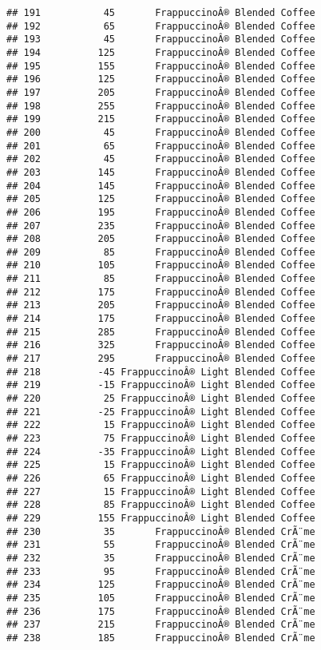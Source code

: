 \documentclass[
]{article}
\begin{document}
\begin{verbatim}
## 191           45       FrappuccinoÂ® Blended Coffee
## 192           65       FrappuccinoÂ® Blended Coffee
## 193           45       FrappuccinoÂ® Blended Coffee
## 194          125       FrappuccinoÂ® Blended Coffee
## 195          155       FrappuccinoÂ® Blended Coffee
## 196          125       FrappuccinoÂ® Blended Coffee
## 197          205       FrappuccinoÂ® Blended Coffee
## 198          255       FrappuccinoÂ® Blended Coffee
## 199          215       FrappuccinoÂ® Blended Coffee
## 200           45       FrappuccinoÂ® Blended Coffee
## 201           65       FrappuccinoÂ® Blended Coffee
## 202           45       FrappuccinoÂ® Blended Coffee
## 203          145       FrappuccinoÂ® Blended Coffee
## 204          145       FrappuccinoÂ® Blended Coffee
## 205          125       FrappuccinoÂ® Blended Coffee
## 206          195       FrappuccinoÂ® Blended Coffee
## 207          235       FrappuccinoÂ® Blended Coffee
## 208          205       FrappuccinoÂ® Blended Coffee
## 209           85       FrappuccinoÂ® Blended Coffee
## 210          105       FrappuccinoÂ® Blended Coffee
## 211           85       FrappuccinoÂ® Blended Coffee
## 212          175       FrappuccinoÂ® Blended Coffee
## 213          205       FrappuccinoÂ® Blended Coffee
## 214          175       FrappuccinoÂ® Blended Coffee
## 215          285       FrappuccinoÂ® Blended Coffee
## 216          325       FrappuccinoÂ® Blended Coffee
## 217          295       FrappuccinoÂ® Blended Coffee
## 218          -45 FrappuccinoÂ® Light Blended Coffee
## 219          -15 FrappuccinoÂ® Light Blended Coffee
## 220           25 FrappuccinoÂ® Light Blended Coffee
## 221          -25 FrappuccinoÂ® Light Blended Coffee
## 222           15 FrappuccinoÂ® Light Blended Coffee
## 223           75 FrappuccinoÂ® Light Blended Coffee
## 224          -35 FrappuccinoÂ® Light Blended Coffee
## 225           15 FrappuccinoÂ® Light Blended Coffee
## 226           65 FrappuccinoÂ® Light Blended Coffee
## 227           15 FrappuccinoÂ® Light Blended Coffee
## 228           85 FrappuccinoÂ® Light Blended Coffee
## 229          155 FrappuccinoÂ® Light Blended Coffee
## 230           35       FrappuccinoÂ® Blended CrÃ¨me
## 231           55       FrappuccinoÂ® Blended CrÃ¨me
## 232           35       FrappuccinoÂ® Blended CrÃ¨me
## 233           95       FrappuccinoÂ® Blended CrÃ¨me
## 234          125       FrappuccinoÂ® Blended CrÃ¨me
## 235          105       FrappuccinoÂ® Blended CrÃ¨me
## 236          175       FrappuccinoÂ® Blended CrÃ¨me
## 237          215       FrappuccinoÂ® Blended CrÃ¨me
## 238          185       FrappuccinoÂ® Blended CrÃ¨me

\end{verbatim}
\end{document}
